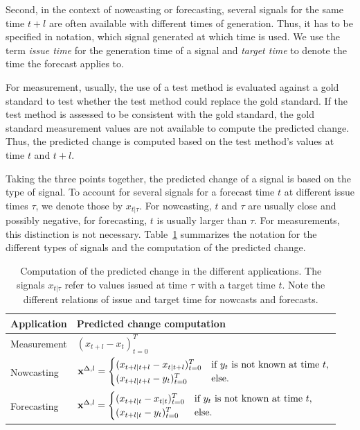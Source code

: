 Second, in the context of nowcasting or forecasting, several signals for the same time $t + l$ are often available with different times of generation.
Thus, it has to be specified in notation, which signal generated at which time is used.
We use the term \textit{issue time} for the generation time of a signal and \textit{target time} to denote the time the forecast applies to.

For measurement, usually, the use of a test method is evaluated against a gold standard to test whether the test method could replace the gold standard.
If the test method is assessed to be consistent with the gold standard, the gold standard measurement values are not available to compute the predicted change.
Thus, the predicted change is computed based on the test method's values at time $t$ and $t + l$.

Taking the three points together, the predicted change of a signal is based on the type of signal.
To account for several signals for a forecast time $t$ at different issue times $\tau$, we denote those by $x_{t | \tau}$.
For nowcasting, $t$ and $\tau$ are usually close and possibly negative, for forecasting, $t$ is usually larger than $\tau$.
For measurements, this distinction is not necessary.
Table~\ref{tab:notation} summarizes the notation for the different types of signals and the computation of the predicted change.

\begin{table}
    \centering
    \begin{tabularx}{0.75\textwidth}{l X}
        \toprule
        Application & Predicted change computation \\
        \midrule
        Measurement & $(x_{t + l} - x_t)_{t=0}^T \label{eq:diffxl_measure} $\\
        Nowcasting & $
\mathbf{x}^{\Delta,l} =
\begin{cases}
(x_{t+l|t+l} -x_{t|t+l})^T_{t=0} & \text{if } y_{t} \text{ is not known at time } t, \\
(x_{t+l|t+l} -y_{t})^T_{t=0} & \text{else}.
\end{cases} \label{eq:diffxl_nowcasting}
$ \\
        Forecasting & $
\mathbf{x}^{\Delta,l} =
\begin{cases}
(x_{t+l|t} - x_{t|t})^T_{t=0} & \text{if } y_{t} \text{ is not known at time } t, \\
(x_{t+l|t} - y_{t})^T_{t=0}  & \text{else}.
\end{cases} \label{eq:diffxl_forecasting}
$\\
        \bottomrule
    \end{tabularx}
    \caption{Computation of the predicted change in the different applications. The signals $x_{t | \tau}$ refer to values issued at time $\tau$ with a target time $t$. Note the different relations of issue and target time for nowcasts and forecasts. }
    \label{tab:notation}
\end{table}



